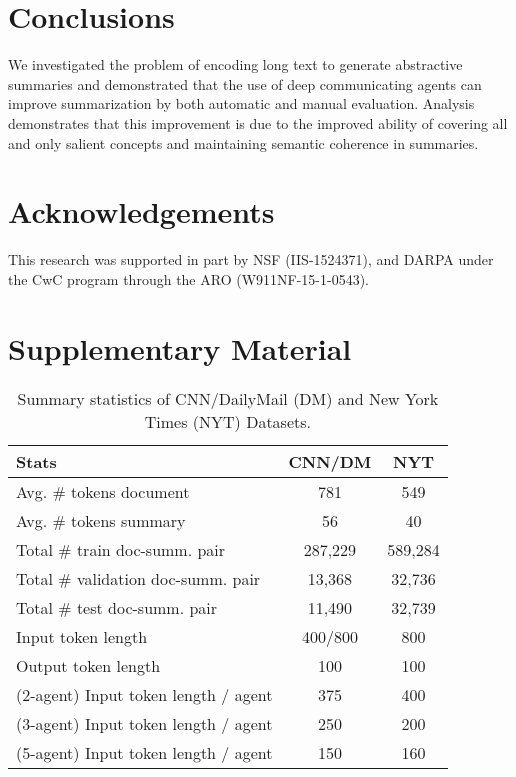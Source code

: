 \documentclass[11pt,a4paper]{article}
\begin{document}
  


 \section{Conclusions}
\label{sec:conclusion}
We investigated the problem of encoding long text 
to generate abstractive summaries and demonstrated that the use of 
deep communicating agents can improve summarization by both automatic and manual evaluation. Analysis demonstrates that this improvement is due to the improved ability of covering all and only salient concepts and maintaining semantic coherence in summaries.

\section*{Acknowledgements}
This research was supported in part by NSF (IIS-1524371), and DARPA under the CwC program through the ARO (W911NF-15-1-0543). 

\newpage
\clearpage{}\appendix
\section{Supplementary Material}
\label{appendix}
\begin{table}[h]
\small
\centering
\begin{tabular}{|l|c|c|}
 \hline
 \textbf{Stats} & \textbf{CNN/DM} & \textbf{NYT} \\
 \hline
 Avg. \# tokens document &781  & 549 \\
 Avg. \# tokens summary & 56 & 40 \\
 Total \# train doc-summ. pair & 287,229 & 589,284\\
 Total \# validation doc-summ. pair & 13,368 & 32,736\\
 Total \# test doc-summ. pair & 11,490 & 32,739\\
 Input token length & 400/800 & 800\\
 Output token length & 100 & 100 \\
 \hline
 (2-agent) Input token length / agent & 375 & 400\\
 (3-agent) Input token length / agent & 250 & 200\\
 (5-agent) Input token length / agent & 150 & 160\\
 \hline
\end{tabular}
\caption{Summary statistics of CNN/DailyMail (DM) and New York Times (NYT) Datasets.}
\label{tab:stats}
\end{table}
\end{document}
